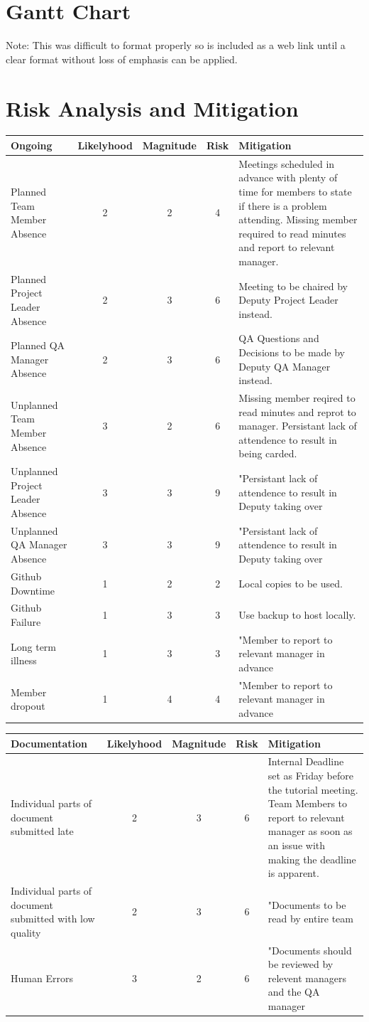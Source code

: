 \documentclass[11pt, titlepage]{article}
\begin{document}
			\clearpage
	\section{Gantt Chart}
		Note: This was difficult to format properly so is included as a web link until a clear format without loss of emphasis can be applied.
		
	\section{Risk Analysis and Mitigation}
	\begin{tabular}[]{| p{3cm} | c | c | c | p{5cm} |}
\hline
\textbf{Ongoing}&\textbf{Likelyhood}&\textbf{Magnitude}&\textbf{Risk}&\textbf{Mitigation} \\ \hline \hline%
Planned Team Member Absence &2&2&4&Meetings scheduled in advance with plenty of time for members to state if there is a problem attending. Missing member required to read minutes and report to relevant manager. \\ \hline
Planned Project Leader Absence&2&3&6&Meeting to be chaired by Deputy Project Leader instead. \\ \hline
Planned QA Manager Absence&2&3&6&QA Questions and Decisions to be made by Deputy QA Manager instead. \\ \hline
Unplanned Team Member Absence &3&2&6&Missing member reqired to read minutes and reprot to manager. Persistant lack of attendence to result in being carded. \\ \hline
Unplanned Project Leader Absence&3&3&9&"Persistant lack of attendence to result in Deputy taking over\\ \hline
Unplanned QA Manager Absence&3&3&9&"Persistant lack of attendence to result in Deputy taking over\\ \hline
Github Downtime&1&2&2&Local copies to be used. \\ \hline
Github Failure&1&3&3&Use backup to host locally. \\ \hline
Long term illness&1&3&3&"Member to report to relevant manager in advance\\ \hline
Member dropout&1&4&4&"Member to report to relevant manager in advance\\ \hline
\end{tabular}

\begin{tabular}[]{| p{3cm} | c | c | c | p{5cm} |}
\hline
\textbf{Documentation}&\textbf{Likelyhood}&\textbf{Magnitude}&\textbf{Risk}&\textbf{Mitigation} \\ \hline \hline

Individual parts of document submitted late&2&3&6&Internal Deadline set as Friday before the tutorial meeting. Team Members to report to relevant manager as soon as an issue with making the deadline is apparent. \\ \hline
Individual parts of document submitted with low quality&2&3&6&"Documents to be read by entire team\\ \hline
Human Errors&3&2&6&"Documents should be reviewed by relevent managers and the QA manager\\ \hline
\end{tabular}
\end{document}
